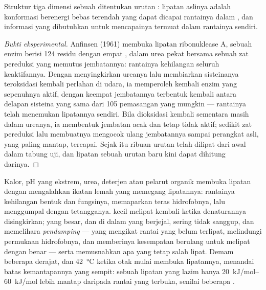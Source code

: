 \begin{theorem}\label{thm:b1:proteins:anfinsen}
Struktur tiga dimensi sebuah  ditentukan urutan :
lipatan aslinya adalah konformasi berenergi bebas terendah yang dapat
dicapai rantainya dalam  , dan informasi yang
dibutuhkan untuk mencapainya termuat dalam rantainya sendiri.
\end{theorem}
\begin{proof}[Bukti eksperimental]
Anfinsen (1961) membuka lipatan ribonuklease A, sebuah enzim berisi
\qty{124}{} residu dengan empat , dalam urea pekat
bersama sebuah zat pereduksi yang memutus jembatannya: rantainya
kehilangan seluruh keaktifannya. Dengan menyingkirkan ureanya lalu
membiarkan sisteinanya teroksidasi kembali perlahan di udara, ia
memperoleh kembali enzim yang sepenuhnya aktif, dengan keempat
jembatannya terbentuk kembali antara delapan sisteina yang sama dari
\qty{105}{} pemasangan yang mungkin --- rantainya telah menemukan
lipatannya sendiri. Bila dioksidasi kembali sementara masih dalam
ureanya, ia membentuk jembatan acak dan tetap tidak aktif; sedikit zat
pereduksi lalu membuatnya mengocok ulang jembatannya sampai perangkat
asli, yang paling mantap, tercapai. Sejak itu ribuan urutan telah
dilipat dari awal dalam tabung uji, dan lipatan sebuah urutan baru kini
dapat dihitung darinya.
\end{proof}

\begin{proposition}[Denaturasi]\label{prop:b1:proteins:denaturation}
Kalor, pH yang ekstrem, urea, deterjen atau pelarut organik membuka
lipatan  dengan mengalahkan ikatan lemah yang memegang
lipatannya: rantainya kehilangan bentuk dan fungsinya, memaparkan teras
hidrofobnya, lalu menggumpal dengan tetangganya.  kecil melipat
kembali ketika denaturannya disingkirkan; yang besar, dan  di
dalam  yang berjejal, sering tidak sanggup, dan  memelihara
\emph{pendamping} ---  yang mengikat
rantai yang belum terlipat, melindungi permukaan hidrofobnya, dan
memberinya kesempatan berulang untuk melipat dengan benar --- serta
memusnahkan apa yang tetap salah lipat. Demam beberapa derajat, dan
\qty{42}{\celsius} ketika  otak mulai membuka lipatannya,
menandai batas kemantapannya yang sempit: sebuah lipatan yang lazim
hanya \qtyrange{20}{60}{kJ/mol} lebih mantap daripada rantai yang
terbuka, senilai beberapa .
\end{proposition}

